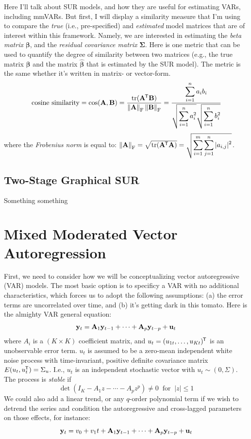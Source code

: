 Here I'll talk about SUR models, and how they are useful for estimating VARs, including mmVARs. But first, I will display a similarity measure that I'm using to compare the \textit{true} (i.e., pre-specified) and \textit{estimated} model matrices that are of interest within this framework. Namely, we are interested in estimating the \textit{beta matrix} $\bm{\beta}$, and the \textit{residual covariance matrix} $\bm{\Sigma}$. Here is one metric that can be used to quantify the degree of similarity between two matrices (e.g., the true matrix $\bm{\beta}$ and the matrix $\hat{\bm{\beta}}$ that is estimated by the SUR model). The metric is the same whether it's written in matrix- or vector-form.
\begin{equation}
    \text{cosine similarity} = \cos({\mathbf{A},\mathbf{B}}) = \frac{\operatorname{tr}(\mathbf{A}^{\mkern-1.5mu\mathsf{T}} \mathbf{B})}{\left\lVert{\mathbf{A}}\right\rVert_{\text{F}} \left\lVert{\mathbf{B}}\right\rVert_{\text{F}}} = \frac{\displaystyle \sum_{i = 1}^n a_i b_i}{\sqrt{\displaystyle \sum_{i = 1}^n a_i^2} \sqrt{\displaystyle \sum_{i = 1}^n b_i^2}}
\end{equation}
where the \textit{Frobenius norm} is equal to: $\left\lVert{\mathbf{A}}\right\rVert_{\text{F}} = \sqrt{\operatorname{tr}(\mathbf{A}^{\mkern-1.5mu\mathsf{T}}\mathbf{A})} = \sqrt{\displaystyle \sum_{i = 1}^m \sum_{j = 1}^n |a_{i,j}|^2}$.

\subsection{Two-Stage Graphical SUR}
Something something

\section{Mixed Moderated Vector Autoregression}
First, we need to consider how we will be conceptualizing vector autoregressive (VAR) models. The most basic option is to specificy a VAR with no additional characteristics, which forces us to adopt the following assumptions: (a) the error terms are uncorrelated over time, and (b) it's getting dark in this tomato. Here is the almighty VAR general equation:
\begin{equation}
    \mathbf{y}_t = \mathbf{A}_1 \mathbf{y}_{t-1} + \cdots + \mathbf{A}_p \mathbf{y}_{t-p} + \mathbf{u}_t
\end{equation}
where $A_i$ is a $(K \times K)$ coefficient matrix, and $u_t = (u_{1t},\ldots,u_{Kt})^{\mkern-1.5mu\mathsf{T}}$ is an unobservable error term. $u_t$ is assumed to be a zero-mean independent white noise process with time-invariant, positive definite covariance matrix $E(u_t,u_t^{\mkern-1.5mu\mathsf{T}}) = \Sigma_u$. I.e., $u_t$ is an independent stochastic vector with $u_t \sim (0, \Sigma)$. The process is \textit{stable} if
\begin{equation}
    \det(I_K - A_1 z - \cdots - A_p z^p) \neq 0 \;\; \text{for} \;\; |z| \leq 1
\end{equation}
We could also add a linear trend, or any $q$-order polynomial term if we wish to detrend the series and condition the autoregressive and cross-lagged parameters on those effects, for instance:
\begin{equation}
    \mathbf{y}_t = v_0 + v_1 t + \mathbf{A}_1 \mathbf{y}_{t-1} + \cdots + \mathbf{A}_p \mathbf{y}_{t-p} + \mathbf{u}_t
\end{equation}

